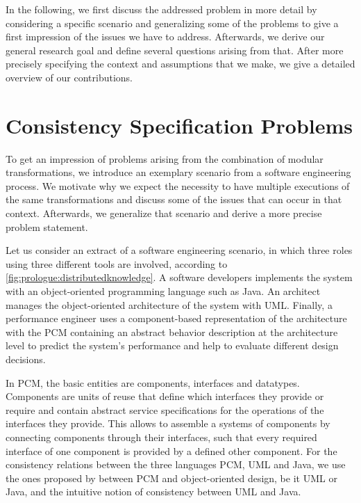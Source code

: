 In the following, we first discuss the addressed problem in more detail by considering a specific scenario and generalizing some of the problems to give a first impression of the issues we have to address.
Afterwards, we derive our general research goal and define several questions arising from that.
After more precisely specifying the context and assumptions that we make, we give a detailed overview of our contributions.



\section{Consistency Specification Problems}

To get an impression of problems arising from the combination of modular transformations, we introduce an exemplary scenario from a software engineering process.
We motivate why we expect the necessity to have multiple executions of the same transformations and discuss some of the issues that can occur in that context.
Afterwards, we generalize that scenario and derive a more precise problem statement.

Let us consider an extract of a software engineering scenario, in which three roles using three different tools are involved, according to \autoref{fig:prologue:distributedknowledge}. 
A software developers implements the system with an object-oriented programming language such as Java.
An architect manages the object-oriented architecture of the system with \gls{UML}. 
Finally, a performance engineer uses a component-based representation of the architecture with the \gls{PCM} containing an abstract behavior description at the architecture level to predict the system's performance and help to evaluate different design decisions.

In \gls{PCM}, the basic entities are components, interfaces and datatypes.
Components are units of reuse that define which interfaces they provide or require and contain abstract service specifications for the operations of the interfaces they provide.
This allows to assemble a systems of components by connecting components through their interfaces, such that every required interface of one component is provided by a defined other component.
For the consistency relations between the three languages \gls{PCM}, \gls{UML} and Java, we use the ones proposed by \textcite{langhammer2017a} between \gls{PCM} and object-oriented design, be it \gls{UML} or Java, and the intuitive notion of consistency between \gls{UML} and Java.

